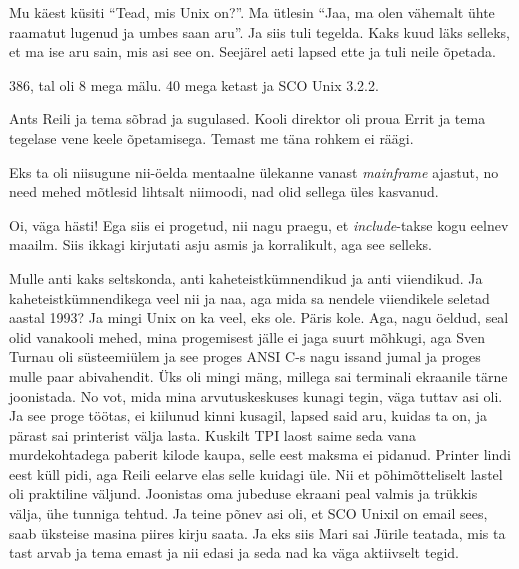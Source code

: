 Mu käest küsiti \enquote{Tead, mis Unix on?}. Ma ütlesin \enquote{Jaa, ma olen vähemalt ühte raamatut lugenud ja umbes saan aru}. Ja siis tuli tegelda. Kaks kuud läks selleks, et ma ise aru sain, mis asi see on. Seejärel aeti lapsed ette ja tuli neile õpetada.


386, tal oli 8 mega mälu. 40 mega ketast ja SCO Unix 3.2.2. 


Ants Reili ja tema sõbrad ja sugulased. Kooli direktor oli proua Errit ja tema tegelase vene keele õpetamisega. Temast me täna rohkem ei räägi. 

Eks  ta oli niisugune nii-öelda mentaalne ülekanne vanast \emph{mainframe} ajastut, no need mehed mõtlesid lihtsalt niimoodi, nad olid sellega üles kasvanud. 


Oi, väga hästi! Ega siis ei progetud, nii nagu praegu, et \emph{include}-takse kogu eelnev maailm. Siis ikkagi kirjutati asju asmis ja korralikult, aga see selleks. 

Mulle anti kaks seltskonda, anti kaheteistkümnendikud ja anti viiendikud. Ja kaheteistkümnendikega veel nii ja naa, aga mida sa nendele viiendikele seletad aastal 1993? Ja  mingi Unix on ka veel, eks ole. Päris kole. Aga, nagu öeldud, seal olid vanakooli mehed, mina progemisest jälle ei jaga suurt mõhkugi, aga Sven Turnau oli  süsteemiülem ja see proges ANSI C-s nagu issand jumal ja proges mulle paar abivahendit. Üks oli mingi mäng, millega sai terminali ekraanile tärne joonistada. No vot, mida mina arvutuskeskuses kunagi tegin, väga tuttav asi oli. Ja see proge töötas, ei kiilunud kinni kusagil, lapsed said aru, kuidas ta on, ja pärast sai printerist välja lasta. Kuskilt TPI laost saime seda vana murdekohtadega paberit kilode kaupa, selle eest maksma ei pidanud. Printer lindi eest küll pidi, aga Reili eelarve elas selle kuidagi  üle. Nii et põhimõtteliselt lastel oli praktiline väljund. Joonistas oma jubeduse  ekraani peal valmis ja trükkis välja, ühe tunniga tehtud. Ja teine põnev asi oli, et SCO Unixil on email sees, saab üksteise masina piires kirju saata. Ja eks siis Mari sai Jürile teatada, mis ta tast arvab ja tema emast ja nii edasi ja seda nad ka väga aktiivselt tegid. 

